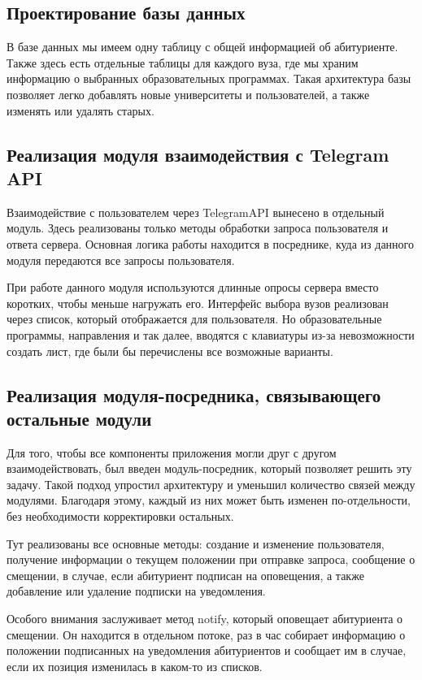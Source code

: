 \documentclass[a4paper,article,14pt]{extarticle}
\begin{document}
\subsection{Проектирование базы данных}

В базе данных мы имеем одну таблицу с общей информацией об абитуриенте. Также здесь есть отдельные таблицы для каждого вуза, где мы храним информацию о выбранных образовательных программах. Такая архитектура базы позволяет легко добавлять новые университеты и пользователей, а также изменять или удалять старых.

\subsection{Реализация модуля взаимодействия с Telegram API}

Взаимодействие с пользователем через TelegramAPI вынесено в отдельный модуль. Здесь реализованы только методы обработки запроса пользователя и ответа сервера. Основная логика работы находится в посреднике, куда из данного модуля передаются все запросы пользователя. 

При работе данного модуля используются длинные опросы сервера вместо коротких, чтобы меньше нагружать его. Интерфейс выбора вузов реализован через список, который отображается для пользователя. Но образовательные программы, направления и так далее, вводятся с клавиатуры из-за невозможности создать лист, где были бы перечислены все возможные варианты.

\subsection{Реализация модуля-посредника, связывающего остальные модули}

Для того, чтобы все компоненты приложения могли друг с другом взаимодействовать, был введен модуль-посредник, который позволяет решить эту задачу. Такой подход упростил архитектуру и уменьшил количество связей между модулями. Благодаря этому, каждый из них может быть изменен по-отдельности, без необходимости корректировки остальных. 

Тут реализованы все основные методы: создание и изменение пользователя, получение информации о текущем положении при отправке запроса, сообщение о смещении, в случае, если абитуриент подписан на оповещения, а также добавление или удаление подписки на уведомления. 

Особого внимания заслуживает метод notify, который оповещает абитуриента о смещении. Он находится в отдельном потоке, раз в час собирает информацию о положении подписанных на уведомления абитуриентов и сообщает им в случае, если их позиция изменилась в каком-то из списков.
\end{document}
